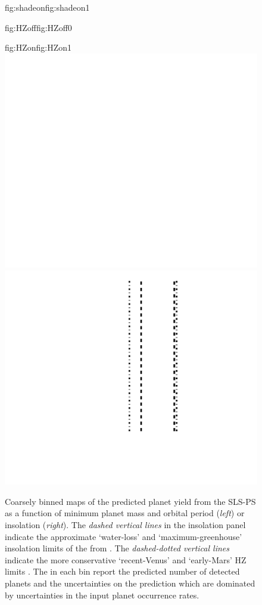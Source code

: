 \begin{figure}
\begin{ocg}{fig:shadeon}{fig:shadeon}{1}
  \end{ocg}
  \hspace{-\hsize}%
  \begin{ocg}{fig:HZoff}{fig:HZoff}{0}%
  \end{ocg}%
  \begin{ocg}{fig:HZon}{fig:HZon}{1}%
    \includegraphics[width=0.5\hsize]{figures/yieldPMpsini_HZ.png}%
    \includegraphics[width=0.5\hsize]{figures/yieldFMpsini_HZ.png}%
  \end{ocg}
  \hspace{-\hsize}%
  \caption[Planet yield maps from the SLS-PS.]
    {\small Coarsely binned maps of the predicted planet yield from 
    the SLS-PS as a function of minimum planet mass and orbital period 
    (\emph{left}) or insolation (\emph{right}). The \emph{dashed vertical lines} in the
    insolation panel indicate the approximate `water-loss' and `maximum-greenhouse' insolation
    limits of the  from \cite{kopparapu13}.
    The \emph{dashed-dotted vertical lines}
    indicate the more conservative `recent-Venus' and `early-Mars' HZ limits \citep{kopparapu13}. The
     in each bin
    report the predicted number of detected planets and the uncertainties on the prediction
    which are dominated by uncertainties in the input planet occurrence rates.}
  \label{BSfig:yield}
\end{figure}

